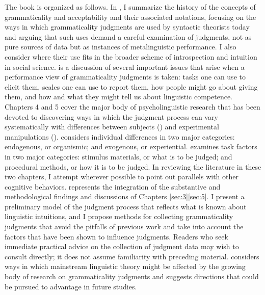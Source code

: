 The book is organized as follows. In , I summarize the history of the concepts of grammaticality and acceptability and their associated notations, focusing on the ways in which grammaticality judgments are used by syntactic theorists today and arguing that such uses demand a careful examination of judgments, not as pure sources of data but as instances of metalinguistic performance. I also consider where their use fits in the broader scheme of introspection and intuition in social science.  is a discussion of several important issues that arise when a performance view of grammaticality judgments is taken: tasks one can use to elicit them, scales one can use to report them, how people might go about giving them, and how and what they might tell us about linguistic competence. Chapters 4 and 5 cover the major body of psycholinguistic research that has been devoted to discovering ways in which the judgment process can vary systematically with differences between subjects () and experimental manipulations ().  considers individual differences in two major categories: endogenous, or organismic; and exogenous, or experiential.  examines task factors in two major categories: stimulus materials, or what is to be judged; and procedural methods, or how it is to be judged. In reviewing the literature in these two chapters, I attempt wherever possible to point out parallels with other cognitive behaviors.  represents the integration of the substantive and methodological findings and discussions of Chapters \ref{sec:3}\textendash{}\ref{sec:5}. I present a preliminary model of the judgment process that reflects what is known about linguistic intuitions, and I propose methods for collecting grammaticality judgments that avoid the pitfalls of previous work and take into account the factors that have
been shown to influence judgments. Readers who seek immediate practical advice on the collection of judgment data may wish to consult  directly; it does not assume familiarity with preceding material.  considers ways in which mainstream linguistic theory might be affected by the growing body of research on grammaticality judgments and suggests directions that could be pursued to advantage in future studies.
